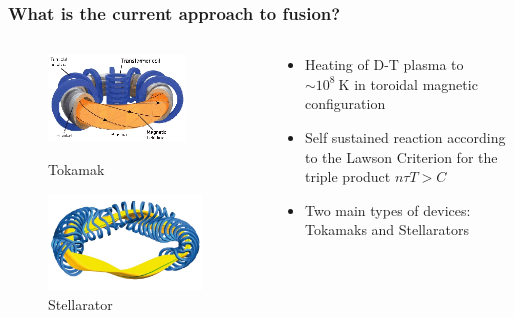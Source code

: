 \documentclass{beamer}
\begin{document}
\begin{frame}
\frametitle{What is the current approach to fusion?}
\vspace{-1.5 cm}
\begin{columns}[onlytextwidth]
	\begin{column}{0.45\textwidth}
		\begin{center}
		\begin{figure}
			\includegraphics[trim={0 0 0 0cm},clip,width=0.8\textwidth]{FIGURES/Schematic-of-a-Tokamak-fusion-reactor-Source-Fusion-for-energy.eps}
			\caption{Tokamak}
					\includegraphics[trim={0 0 0 0cm},clip,width=0.9\textwidth]{FIGURES/W7X-Spulen_Plasma_blau_gelb.jpg}
		\caption{Stellarator}
		\end{figure}
		\end{center}
	\end{column}
	\begin{column}{0.45\textwidth}
		\vspace{0 cm}
		\begin{center}
			\begin{itemize}
				\item Heating of D-T plasma to $\sim10^8~\text{K}$ in toroidal magnetic configuration
				\item Self sustained reaction according to the Lawson Criterion for the triple product $n\tau T > C$
				\item Two main types of devices: Tokamaks and Stellarators
			\end{itemize}
		\end{center}
	\end{column}
\end{columns}
 \end{frame}
\end{document}

